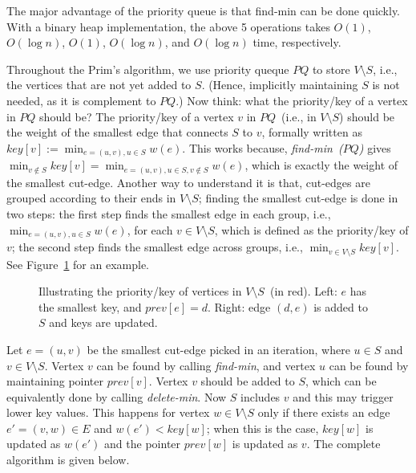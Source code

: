 The major advantage of the priority queue is that find-min can be done quickly.
With a binary heap implementation, the above 5 operations takes $O(1)$, $O(\log n)$, $O(1)$,
$O(\log n)$, and $O(\log n)$ time, respectively.

Throughout the Prim's algorithm, we use priority queque $PQ$ to store $V\setminus S$, i.e., 
the vertices that are not yet added to $S$.
(Hence, implicitly maintaining $S$ is not needed, as it is complement to $PQ$.)
Now think: what the priority/key of a vertex in $PQ$ should be?
The priority/key of a vertex $v$ in $PQ$~(i.e., in $V\setminus S$) 
should be the weight of the smallest edge that connects $S$ to $v$, formally written as
$key[v] := \min_{e=(u,v), u\in S} w(e)$.
This works because, \emph{find-min~($PQ$)} gives
$\min_{v\not\in S} key[v] = \min_{e=(u,v), u\in S, v\not\in S} w(e)$, which is exactly 
the weight of the smallest cut-edge. %
Another way to understand it is that, cut-edges are grouped according to their ends in $V\setminus S$;
finding the smallest cut-edge is done in two steps: the first step finds the smallest edge in each group,
i.e., $\min_{e=(u,v), u\in S} w(e)$,  for each $v\in V\setminus S$, 
which is defined as the priority/key of $v$;
the second step finds the smallest edge across groups, i.e., $\min_{v\in V\setminus S} key[v]$.
See  Figure~\ref{fig:prim} for an example.

\begin{figure}[h]
\centering{}
\caption{Illustrating the priority/key of vertices in $V\setminus S$~(in red).
Left: $e$ has the smallest key, and $prev[e] = d$.
Right: edge $(d,e)$ is added to $S$ and keys are updated.}
\label{fig:prim}
\end{figure}

Let $e=(u,v)$ be the smallest cut-edge picked in an iteration, where $u\in S$ and $v\in V\setminus S$.
Vertex $v$ can be found by calling \emph{find-min}, and vertex $u$ can be found by maintaining
pointer $prev[v]$.
Vertex $v$ should be added to $S$, which can be equivalently done by calling
\emph{delete-min}. Now $S$ includes $v$ and this may trigger lower key values.
This happens for vertex $w\in V\setminus S$ only if there exists an edge
$e' = (v,w)\in E$ and $w(e') < key[w]$; when this is the case,
$key[w]$ is updated as $w(e')$ and the pointer $prev[w]$ is updated as $v$.
The complete algorithm is given below.

